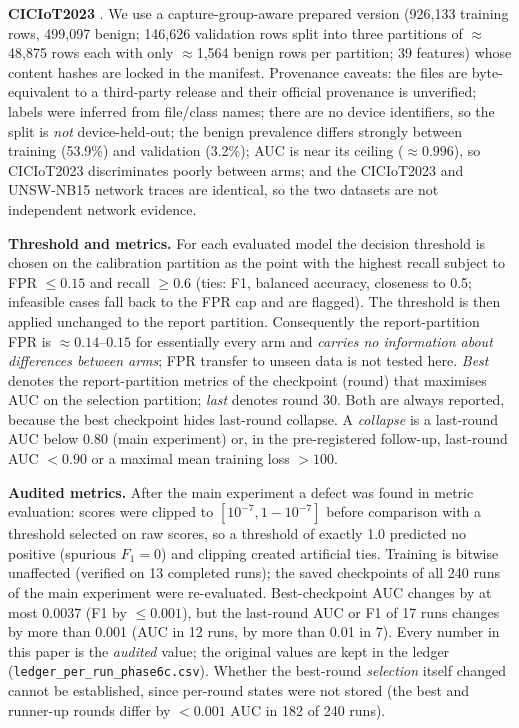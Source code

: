 \documentclass[preprint,12pt,times,numafflabel]{elsarticle}
\begin{document}
\textbf{CICIoT2023} \cite{neto2023ciciot}. We use a capture-group-aware prepared version (926{,}133 training rows, 499{,}097 benign; 146{,}626 validation rows split into three partitions of $\approx$48{,}875 rows each with only $\approx$1{,}564 benign rows per partition; 39 features) whose content hashes are locked in the manifest. Provenance caveats: the files are byte-equivalent to a third-party release and their official provenance is unverified; labels were inferred from file/class names; there are no device identifiers, so the split is \emph{not} device-held-out; the benign prevalence differs strongly between training (53.9\%) and validation (3.2\%); AUC is near its ceiling ($\approx0.996$), so CICIoT2023 discriminates poorly between arms; and the CICIoT2023 and UNSW-NB15 network traces are identical, so the two datasets are not independent network evidence.

\textbf{Threshold and metrics.} For each evaluated model the decision threshold is chosen on the calibration partition as the point with the highest recall subject to FPR $\le0.15$ and recall $\ge0.6$ (ties: F1, balanced accuracy, closeness to 0.5; infeasible cases fall back to the FPR cap and are flagged). The threshold is then applied unchanged to the report partition. Consequently the report-partition FPR is $\approx0.14$--$0.15$ for essentially every arm and \emph{carries no information about differences between arms}; FPR transfer to unseen data is not tested here. \emph{Best} denotes the report-partition metrics of the checkpoint (round) that maximises AUC on the selection partition; \emph{last} denotes round 30. Both are always reported, because the best checkpoint hides last-round collapse. A \emph{collapse} is a last-round AUC below 0.80 (main experiment) or, in the pre-registered follow-up, last-round AUC $<0.90$ or a maximal mean training loss $>100$.

\textbf{Audited metrics.} After the main experiment a defect was found in metric evaluation: scores were clipped to $[10^{-7},1-10^{-7}]$ before comparison with a threshold selected on raw scores, so a threshold of exactly 1.0 predicted no positive (spurious $F_1=0$) and clipping created artificial ties. Training is bitwise unaffected (verified on 13 completed runs); the saved checkpoints of all 240 runs of the main experiment were re-evaluated. Best-checkpoint AUC changes by at most $0.0037$ (F1 by $\le0.001$), but the last-round AUC or F1 of 17 runs changes by more than 0.001 (AUC in 12 runs, by more than 0.01 in 7). Every number in this paper is the \emph{audited} value; the original values are kept in the ledger (\texttt{ledger\_per\_run\_phase6c.csv}). Whether the best-round \emph{selection} itself changed cannot be established, since per-round states were not stored (the best and runner-up rounds differ by $<0.001$ AUC in 182 of 240 runs).
\end{document}
